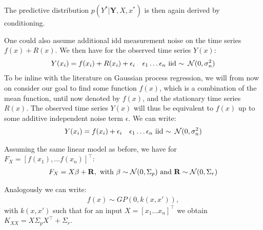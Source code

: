 The predictive distribution $p(Y^{\ast} | \mathbf{Y}, X, x^{\ast})$ is then again derived by conditioning.

One could also assume additional idd measurement noise on the time series $f(x) + R(x)$.
We then have for the observed time series $Y(x)$:
\begin{align*}
    Y(x_i) = f(x_i) + R(x_i) + \epsilon_i   && \epsilon_1 \dots \epsilon_n \text{ iid }{\sim} \text{ } \operatorname{\mathcal{N}}(0, \sigma_n^{2})
\end{align*}
To be inline with the literature on Gaussian process regression, we will from now on consider
our goal to find some function $f(x)$, which is a combination of the mean function, until now denoted by $f(x)$,
and the stationary time series $R(x)$.
The observed time series $Y(x)$ will thus be equivalent to $f(x)$ up to some additive independent noise term $\epsilon$.
We can write:
\begin{align*}
    Y(x_i) = f(x_i) + \epsilon_i && \epsilon_1 \dots \epsilon_n \text{ iid }{\sim} \text{ } \operatorname{\mathcal{N}}(0, \sigma_n^{2})
\end{align*}

Assuming the same linear model as before, we have for $F_X = [f(x_1), \dots f(x_n)]^{\top}$:
\begin{gather*}
    F_X = X \beta + \mathbf{R}, \text{ with $\beta \sim \operatorname{\mathcal{N}}(0, \Sigma_p)$ and $\mathbf{R} \sim \operatorname{\mathcal{N}}(0, \Sigma_r)$}
\end{gather*}
%

Analogously we can write:
\begin{gather*}
    f(x) \sim GP(0, k(x, x')),
\end{gather*}
with $k(x,x')$ such that for an input $X = [x_1 \dots x_n]^{\top}$ we obtain $K_{XX} =  X \Sigma_p X^{\top} + \Sigma_r$.

